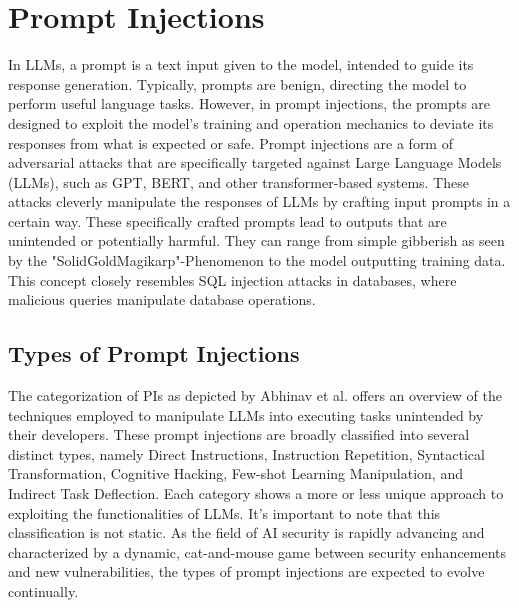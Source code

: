 \documentclass{SeminarV2}
\begin{document}
\section{Prompt Injections}

In LLMs, a prompt is a text input given to the model, intended to guide its response generation. Typically, prompts are benign, directing the model to perform useful language tasks. However, in prompt injections, the prompts are designed to exploit the model's training and operation mechanics to deviate its responses from what is expected or safe. Prompt injections are a form of adversarial attacks that are specifically targeted against Large Language Models (LLMs), such as GPT, BERT, and other transformer-based systems. These attacks cleverly manipulate the responses of LLMs by crafting input prompts in a certain way. These specifically crafted prompts lead to outputs that are unintended or potentially harmful. They can range from simple gibberish as seen by the "SolidGoldMagikarp"-Phenomenon \cite{rao2023tricking} to the model outputting training data. This concept closely resembles SQL injection attacks in databases, where malicious queries manipulate database operations.


\subsection{Types of Prompt Injections}


The categorization of PIs as depicted by Abhinav et al. \cite{abdelnabi2023not} offers an overview of the techniques employed to manipulate LLMs into executing tasks unintended by their developers. These prompt injections are broadly classified into several distinct types, namely Direct Instructions, Instruction Repetition, Syntactical Transformation, Cognitive Hacking, Few-shot Learning Manipulation, and Indirect Task Deflection. Each category shows a more or less unique approach to exploiting the functionalities of LLMs. It's important to note that this classification is not static. As the field of AI security is rapidly advancing and characterized by a dynamic, cat-and-mouse game between security enhancements and new vulnerabilities, the types of prompt injections are expected to evolve continually.
\end{document}

